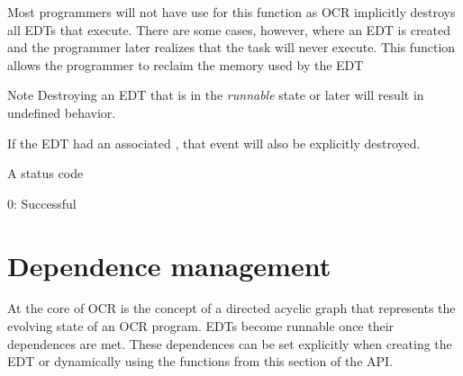 \descr
Most programmers will not have use for this function as OCR implicitly destroys all
EDTs that execute. There are some cases, however, where an EDT is created and the
programmer later realizes that the task will never execute. This function allows the
programmer to reclaim the memory used by the EDT
\begin{DoxyNote}{Note}
Destroying an EDT that is in the \emph{runnable} state or later will result in
undefined behavior.

If the EDT had an associated , that event will also be explicitly
destroyed.
\end{DoxyNote}

\returns
A status code
\begin{DoxyItemize}
\item 0: Successful
\end{DoxyItemize}
\section{Dependence management}
\label{sec:OCRDependenceManagement}

At the core of OCR is the concept of a directed acyclic graph that represents the evolving
state of an OCR program. EDTs become runnable once their dependences are met.
These dependences can be set explicitly when creating the EDT or dynamically using
the functions from this section of the API.


